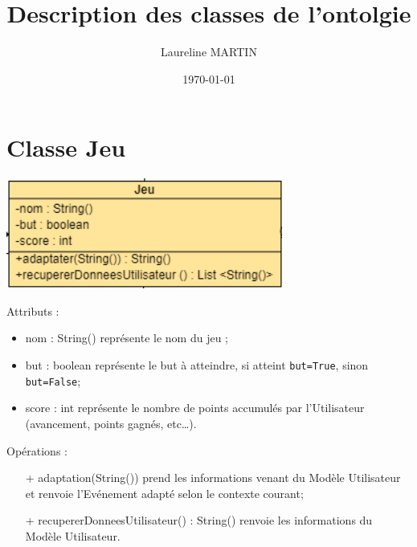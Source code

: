 \documentclass{article}
\title{Description des classes de l'ontolgie}
\author{Laureline MARTIN}
\date{\today}
\begin{document}
	\section{Classe Jeu}
		\begin{center}
			\includegraphics[scale=0.5]{include/Classe_Jeu.PNG}\newline
		\end{center}
		Attributs :
		\begin{itemize}
			\item nom : String() représente le nom du jeu ;
			\item but : boolean représente le but à atteindre, si atteint \texttt{but=True}, sinon \texttt{but=False};
			\item score : int représente le nombre de points accumulés par l’Utilisateur (avancement, points gagnés, etc…).
		\end{itemize}
		\medskip
		Opérations :
		\begin{itemize}
			\item[+] adaptation(String()) prend les informations venant du Modèle Utilisateur et renvoie l’Evénement adapté selon le contexte courant;
			\item[+] recupererDonneesUtilisateur() : String() renvoie les informations du Modèle Utilisateur.
		\end{itemize}
\end{document}
